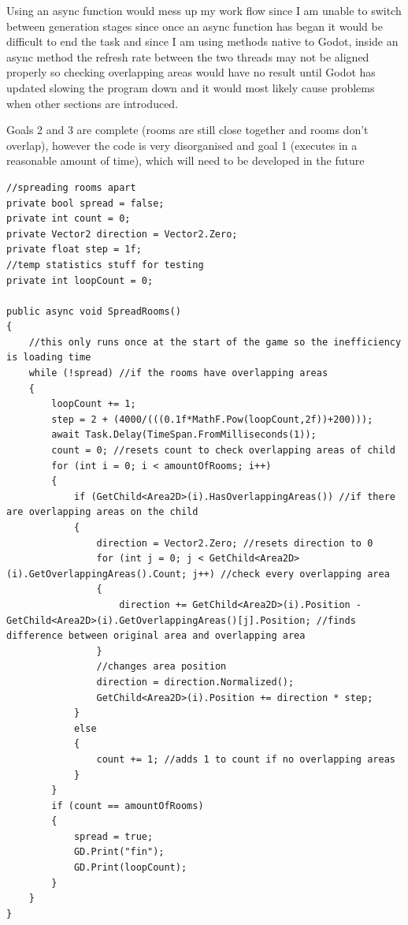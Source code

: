 \documentclass{article}
\newcommand{\parBr}{\vspace{5mm}}%
\begin{document}
\parBr

Using an async function would mess up my work flow since I am unable to switch between generation stages since once an async function has began it would be difficult to end the task and since I am using methods native to Godot, inside an async method the refresh rate between the two threads may not be aligned properly so checking overlapping areas would have no result until Godot has updated slowing the program down and it would most likely cause problems when other sections are introduced.

\parBr

Goals 2 and 3 are complete (rooms are still close together and rooms don't overlap), however the code is very disorganised and goal 1 (executes in a reasonable amount of time), which will need to be developed in the future
\begin{lstlisting}
//spreading rooms apart
private bool spread = false;
private int count = 0;
private Vector2 direction = Vector2.Zero;
private float step = 1f;
//temp statistics stuff for testing
private int loopCount = 0;

public async void SpreadRooms()
{
    //this only runs once at the start of the game so the inefficiency is loading time
    while (!spread) //if the rooms have overlapping areas
    {
        loopCount += 1;
        step = 2 + (4000/(((0.1f*MathF.Pow(loopCount,2f))+200)));
        await Task.Delay(TimeSpan.FromMilliseconds(1));
        count = 0; //resets count to check overlapping areas of child
        for (int i = 0; i < amountOfRooms; i++)
        {
            if (GetChild<Area2D>(i).HasOverlappingAreas()) //if there are overlapping areas on the child
            {
                direction = Vector2.Zero; //resets direction to 0
                for (int j = 0; j < GetChild<Area2D>(i).GetOverlappingAreas().Count; j++) //check every overlapping area
                {
                    direction += GetChild<Area2D>(i).Position - GetChild<Area2D>(i).GetOverlappingAreas()[j].Position; //finds difference between original area and overlapping area
                }
                //changes area position
                direction = direction.Normalized();
                GetChild<Area2D>(i).Position += direction * step;
            }
            else
            {
                count += 1; //adds 1 to count if no overlapping areas
            }
        }
        if (count == amountOfRooms)
        {
            spread = true;
            GD.Print("fin");
            GD.Print(loopCount);
        }
    }
}
\end{lstlisting}
\end{document}
